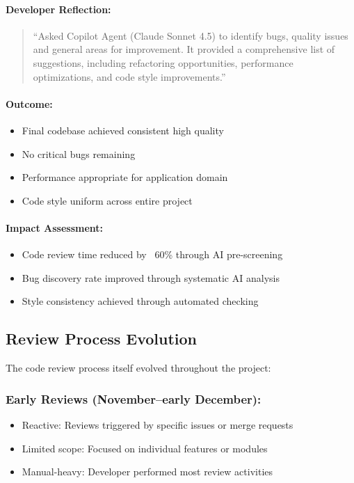 \documentclass[12pt,a4paper]{article}
\begin{document}
\paragraph{Developer Reflection:}
\begin{quote}
``Asked Copilot Agent (Claude Sonnet 4.5) to identify bugs, quality issues and general areas for improvement. It provided a comprehensive list of suggestions, including refactoring opportunities, performance optimizations, and code style improvements.''
\end{quote}

\paragraph{Outcome:}
\begin{itemize}
    \item Final codebase achieved consistent high quality
    \item No critical bugs remaining
    \item Performance appropriate for application domain
    \item Code style uniform across entire project
\end{itemize}

\paragraph{Impact Assessment:}
\begin{itemize}
    \item Code review time reduced by ~60\% through AI pre-screening
    \item Bug discovery rate improved through systematic AI analysis
    \item Style consistency achieved through automated checking
\end{itemize}

\subsection{Review Process Evolution}

The code review process itself evolved throughout the project:

\subsubsection*{Early Reviews (November--early December):}
\begin{itemize}
    \item Reactive: Reviews triggered by specific issues or merge requests
    \item Limited scope: Focused on individual features or modules
    \item Manual-heavy: Developer performed most review activities
\end{itemize}
\end{document}
